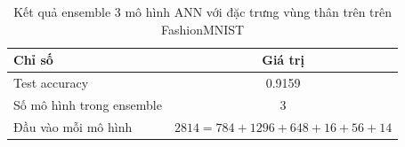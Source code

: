 \begin{table}[H]
\centering
\caption{Kết quả ensemble 3 mô hình ANN với đặc trưng vùng thân trên trên FashionMNIST}
\label{tab:fashion-mnist-region-fusion-results}
\begin{tabular}{l c}
\toprule
Chỉ số & Giá trị \\
\midrule
Test accuracy & 0.9159 \\
Số mô hình trong ensemble & 3 \\
Đầu vào mỗi mô hình & $2814 = 784 + 1296 + 648 + 16 + 56 + 14$ \\
\bottomrule
\end{tabular}
\end{table}

